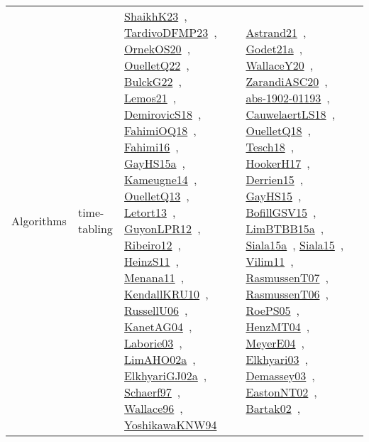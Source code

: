 {\begin{longtable}{lp{3cm}>{\raggedright\arraybackslash}p{6cm}>{\raggedright\arraybackslash}p{6cm}>{\raggedright\arraybackslash}p{8cm}}
\index{time-tabling}\index{Algorithms!time-tabling}Algorithms & time-tabling & \href{../works/ShaikhK23.pdf}{ShaikhK23}~\cite{ShaikhK23}, \href{../works/TardivoDFMP23.pdf}{TardivoDFMP23}~\cite{TardivoDFMP23}, \href{../works/OrnekOS20.pdf}{OrnekOS20}~\cite{OrnekOS20}, \href{../works/OuelletQ22.pdf}{OuelletQ22}~\cite{OuelletQ22}, \href{../works/BulckG22.pdf}{BulckG22}~\cite{BulckG22}, \href{../works/Lemos21.pdf}{Lemos21}~\cite{Lemos21}, \href{../works/DemirovicS18.pdf}{DemirovicS18}~\cite{DemirovicS18}, \href{../works/FahimiOQ18.pdf}{FahimiOQ18}~\cite{FahimiOQ18}, \href{../works/Fahimi16.pdf}{Fahimi16}~\cite{Fahimi16}, \href{../works/GayHS15a.pdf}{GayHS15a}~\cite{GayHS15a}, \href{../works/Kameugne14.pdf}{Kameugne14}~\cite{Kameugne14}, \href{../works/OuelletQ13.pdf}{OuelletQ13}~\cite{OuelletQ13}, \href{../works/Letort13.pdf}{Letort13}~\cite{Letort13}, \href{../works/GuyonLPR12.pdf}{GuyonLPR12}~\cite{GuyonLPR12}, \href{../works/Ribeiro12.pdf}{Ribeiro12}~\cite{Ribeiro12}, \href{../works/HeinzS11.pdf}{HeinzS11}~\cite{HeinzS11}, \href{../works/Menana11.pdf}{Menana11}~\cite{Menana11}, \href{../works/KendallKRU10.pdf}{KendallKRU10}~\cite{KendallKRU10}, \href{../works/RussellU06.pdf}{RussellU06}~\cite{RussellU06}, \href{../works/KanetAG04.pdf}{KanetAG04}~\cite{KanetAG04}, \href{../works/Laborie03.pdf}{Laborie03}~\cite{Laborie03}, \href{../works/LimAHO02a.pdf}{LimAHO02a}~\cite{LimAHO02a}, \href{../works/ElkhyariGJ02a.pdf}{ElkhyariGJ02a}~\cite{ElkhyariGJ02a}, \href{../works/Schaerf97.pdf}{Schaerf97}~\cite{Schaerf97}, \href{../works/Wallace96.pdf}{Wallace96}~\cite{Wallace96}, \href{../works/YoshikawaKNW94.pdf}{YoshikawaKNW94}~\cite{YoshikawaKNW94} & \href{../works/Astrand21.pdf}{Astrand21}~\cite{Astrand21}, \href{../works/Godet21a.pdf}{Godet21a}~\cite{Godet21a}, \href{../works/WallaceY20.pdf}{WallaceY20}~\cite{WallaceY20}, \href{../works/ZarandiASC20.pdf}{ZarandiASC20}~\cite{ZarandiASC20}, \href{../works/abs-1902-01193.pdf}{abs-1902-01193}~\cite{abs-1902-01193}, \href{../works/CauwelaertLS18.pdf}{CauwelaertLS18}~\cite{CauwelaertLS18}, \href{../works/OuelletQ18.pdf}{OuelletQ18}~\cite{OuelletQ18}, \href{../works/Tesch18.pdf}{Tesch18}~\cite{Tesch18}, \href{../works/HookerH17.pdf}{HookerH17}~\cite{HookerH17}, \href{../works/Derrien15.pdf}{Derrien15}~\cite{Derrien15}, \href{../works/GayHS15.pdf}{GayHS15}~\cite{GayHS15}, \href{../works/BofillGSV15.pdf}{BofillGSV15}~\cite{BofillGSV15}, \href{../works/LimBTBB15a.pdf}{LimBTBB15a}~\cite{LimBTBB15a}, \href{../works/Siala15a.pdf}{Siala15a}~\cite{Siala15a}, \href{../works/Siala15.pdf}{Siala15}~\cite{Siala15}, \href{../works/Vilim11.pdf}{Vilim11}~\cite{Vilim11}, \href{../works/RasmussenT07.pdf}{RasmussenT07}~\cite{RasmussenT07}, \href{../works/RasmussenT06.pdf}{RasmussenT06}~\cite{RasmussenT06}, \href{../works/RoePS05.pdf}{RoePS05}~\cite{RoePS05}, \href{../works/HenzMT04.pdf}{HenzMT04}~\cite{HenzMT04}, \href{../works/MeyerE04.pdf}{MeyerE04}~\cite{MeyerE04}, \href{../works/Elkhyari03.pdf}{Elkhyari03}~\cite{Elkhyari03}, \href{../works/Demassey03.pdf}{Demassey03}~\cite{Demassey03}, \href{../works/EastonNT02.pdf}{EastonNT02}~\cite{EastonNT02}, \href{../works/Bartak02.pdf}{Bartak02}~\cite{Bartak02}, 
\end{longtable}}
